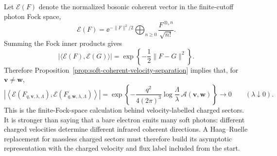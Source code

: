 Let \(\mathcal E(F)\) denote the normalized bosonic coherent vector in the
finite-cutoff photon Fock space,
\[
  \mathcal E(F)
  =
  \ee^{-\|F\|^2/2}
  \bigoplus_{n\ge0}\frac{F^{\otimes_s n}}{\sqrt{n!}} .
\]
Summing the Fock inner products gives
\[
  \left|
    \langle \mathcal E(F),\mathcal E(G)\rangle
  \right|
  =
  \exp\!\left\{-\frac12\|F-G\|^2\right\}.
\]
Therefore Proposition~\ref{prop:soft-coherent-velocity-separation} implies
that, for \(\mathbf v\ne\mathbf w\),
\[
  \left|
    \left\langle
      \mathcal E(F_{q,\mathbf v,\lambda,\Lambda}),
      \mathcal E(F_{q,\mathbf w,\lambda,\Lambda})
    \right\rangle
  \right|
  =
  \exp\!\left\{
    -\frac{q^2}{4(2\pi)^3}
    \log\frac{\Lambda}{\lambda}\,
    \mathcal A(\mathbf v,\mathbf w)
  \right\}
  \longrightarrow0
  \qquad(\lambda\downarrow0).
\]
This is the finite-Fock-space calculation behind velocity-labelled charged
sectors.  It is stronger than saying that a bare electron emits many soft
photons: different charged velocities determine different infrared coherent
directions.  A Haag--Ruelle replacement for massless charged sectors must
therefore build its asymptotic representation with the charged velocity and
flux label included from the start.

